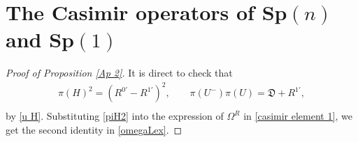 \documentclass[a4paper,11pt]{amsart}
\numberwithin{equation}{section}
\begin{document}
\section{The Casimir operators of Sp$(n)$ and Sp$(1)$}
\begin{proof}[Proof of Proposition \ref{Ap 2}]
It is direct to check that
\begin{equation}\begin{aligned}\label{piH2}
\pi(H)^2= ({R^{0'}}-{R^{1'}})^2,\qquad \pi(U^{-}) \pi(U)= \mathfrak{D}+R^{1'},\\
\end{aligned}\end{equation}
by \eqref{u H}.
Substituting \eqref{piH2} into the expression of $\Omega^R$ in \eqref{casimir element 1}, we get the second identity in \eqref{omegaLex}.


\end{proof}
\end{document}
